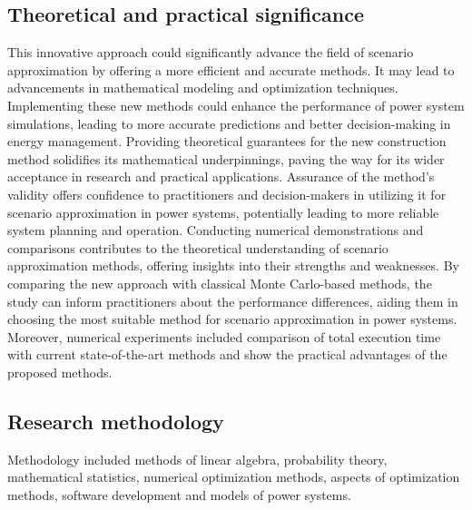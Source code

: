 \subsection*{Theoretical and practical significance}
This innovative approach could significantly advance the field of scenario approximation by offering a more efficient and accurate methods. It may lead to advancements in mathematical modeling and optimization techniques. Implementing these new methods could enhance the performance of power system simulations, leading to more accurate predictions and better decision-making in energy management. Providing theoretical guarantees for the new construction method solidifies its mathematical underpinnings, paving the way for its wider acceptance in research and practical applications. Assurance of the method's validity offers confidence to practitioners and decision-makers in utilizing it for scenario approximation in power systems, potentially leading to more reliable system planning and operation. Conducting numerical demonstrations and comparisons contributes to the theoretical understanding of scenario approximation methods, offering insights into their strengths and weaknesses. By comparing the new approach with classical Monte Carlo-based methods, the study can inform practitioners about the performance differences, aiding them in choosing the most suitable method for scenario approximation in power systems. Moreover, numerical experiments included comparison of total execution time with current state-of-the-art methods and show the practical advantages of the proposed methods.



\subsection*{Research methodology}
Methodology included methods of linear algebra, probability theory, mathematical statistics, numerical optimization methods, aspects of optimization methods, software development and models of power systems.
